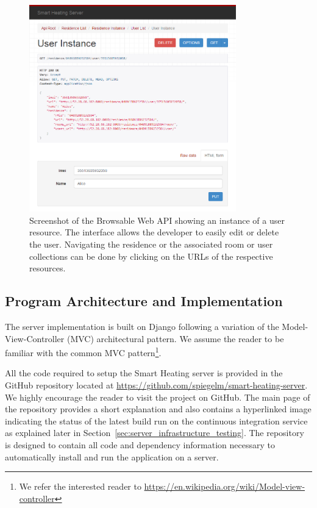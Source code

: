 \begin{figure}[h]
	\begin{center}
		\includegraphics[width=0.8\textwidth]{images/server_browable_api_user_instance.png}
	\end{center}
	\caption{Screenshot of the Browsable Web API showing an instance of a user resource. The interface allows the developer to easily edit or delete the user. Navigating the residence or the associated room or user collections can be done by clicking on the URLs of the respective resources.}
	\label{fig:server_infrastructure_browsable_api}
\end{figure}


\subsection{Program Architecture and Implementation}
\label{sec:server_infrastructure_program_architecture_implementation}

The server implementation is built on Django following a variation
of the Model-View-Controller (MVC) architectural pattern.
We assume the reader to be familiar with the common MVC pattern\footnote{We refer the interested reader to \url{https://en.wikipedia.org/wiki/Model-view-controller}}.

All the code required to setup the Smart Heating server is provided in the GitHub repository located at \url{https://github.com/spiegelm/smart-heating-server}.
We highly encourage the reader to visit the project on GitHub.
The main page of the repository provides a short explanation and also contains a hyperlinked image indicating the status of the latest build run on the continuous integration service as explained later in Section~\ref{sec:server_infrastructure_testing}.
The repository is designed to contain all code and dependency information necessary to automatically install and run the application on a server.

